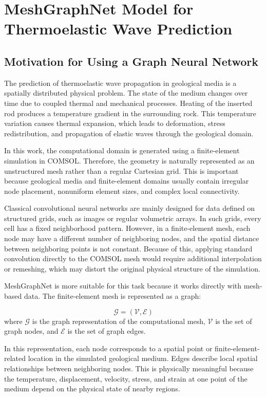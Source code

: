 \section{MeshGraphNet Model for Thermoelastic Wave Prediction}

\subsection{Motivation for Using a Graph Neural Network}

The prediction of thermoelastic wave propagation in geological media is a spatially distributed physical problem. The state of the medium changes over time due to coupled thermal and mechanical processes. Heating of the inserted rod produces a temperature gradient in the surrounding rock. This temperature variation causes thermal expansion, which leads to deformation, stress redistribution, and propagation of elastic waves through the geological domain.

In this work, the computational domain is generated using a finite-element simulation in COMSOL. Therefore, the geometry is naturally represented as an unstructured mesh rather than a regular Cartesian grid. This is important because geological media and finite-element domains usually contain irregular node placement, nonuniform element sizes, and complex local connectivity.

Classical convolutional neural networks are mainly designed for data defined on structured grids, such as images or regular volumetric arrays. In such grids, every cell has a fixed neighborhood pattern. However, in a finite-element mesh, each node may have a different number of neighboring nodes, and the spatial distance between neighboring points is not constant. Because of this, applying standard convolution directly to the COMSOL mesh would require additional interpolation or remeshing, which may distort the original physical structure of the simulation.

MeshGraphNet is more suitable for this task because it works directly with mesh-based data. The finite-element mesh is represented as a graph:

\begin{equation}
\mathcal{G} = (\mathcal{V}, \mathcal{E})
\end{equation}
where \(\mathcal{G}\) is the graph representation of the computational mesh, \(\mathcal{V}\) is the set of graph nodes, and \(\mathcal{E}\) is the set of graph edges.

In this representation, each node corresponds to a spatial point or finite-element-related location in the simulated geological medium. Edges describe local spatial relationships between neighboring nodes. This is physically meaningful because the temperature, displacement, velocity, stress, and strain at one point of the medium depend on the physical state of nearby regions.

